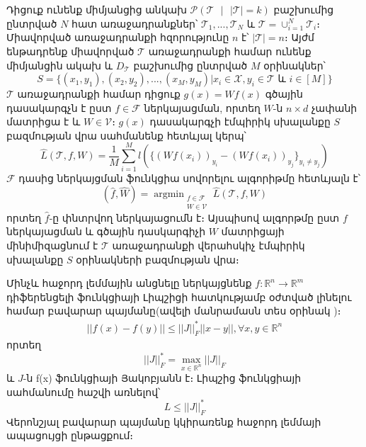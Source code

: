 \documentclass[12pt]{article}
\DeclareMathOperator*{\argmin}{argmin}
\begin{document}
Դիցուք ունենք միմյանցից անկախ $\mathcal{P}(\mathcal{T} \text{ } |\text{ }  |\mathcal{T}| = k)$ բաշխումից ընտրված $N$ հատ առաջադրանքներ՝ $\mathcal{T}_1, ..., \mathcal{T}_N$  և $\mathcal{T} = \cup_{i=1}^N{\mathcal{T}_i}$։ Միավորված առաջադրանքի հզորությունը $n$ է՝  $|\mathcal{T}| =n $։ Այժմ ենթադրենք միավորված $\mathcal{T}$ առաջադրանքի համար ունենք միմյանցին ակախ և $D_{\mathcal{T}}$ բաշխումից ընտրված $M$ օրինակներ՝
$$S = \{(x_1, y_1), (x_2, y_2), ..., (x_M, y_M) | x_i \in \mathcal{X}, y_i \in \mathcal{T} \text{ և } i \in [M] \}$$
$\mathcal{T}$   առաջադրանքի համար դիցուք $g(x) = Wf(x)$ գծային դասակարգչն է ըստ $f \in \mathcal{F}$ ներկայացման, որտեղ $W$-ն $n \times d$ չափանի մատրիցա է և $W \in \mathcal{V}$։ $g(x)$ դասակարգչի էմպիրիկ սխալանքը $S$ բազմության վրա սահմանենք հետևյալ կերպ՝
$$\hat{L}(\mathcal{T},f, W) = \frac{1}{M}\sum_{i=1}^Ml(\{(Wf(x_i))_{y_i} - (Wf(x_i))_{y_j}\}_{y_i \neq y_j})$$ 
$\mathcal{F}$ դասից  ներկայցման ֆունկցիա սովորելու ալգորիթմը հետևյալն է՝
$$(\hat{f}, \hat{W}) = \argmin_{\substack{f \in \mathcal{F} \\ W \in \mathcal{V}}} \hat{L}(\mathcal{T},f, W)$$
որտեղ $\hat{f}$-ը փնտրվող ներկայացումն է։ Այսպիսով ալգորթմը ըստ $f$ ներկայացման և գծային դասկարգիչի $W$ մատրիցայի  մինիմիզացնում է $\mathcal{T}$ առաջադրանքի վերահսկիչ էմպիրիկ սխալանքը $S$ օրինակների բազմության վրա։

Մինչև հաջորդ լեմմային անցնելը ներկայցնենք $f:\mathbb{R}^n \rightarrow \mathbb{R}^m$ դիֆերենցելի ֆունկցիայի Լիպշիցի հատկությամբ օժտված լինելու համար բավարար պայմանը(ավելի մանրամասն տես օրինակ \cite[էջ 60-61]{bib_item_13})։ 
\begin{align*}
||f(x) - f(y)|| \leq ||J||_F^* ||x-y||, \forall x, y \in \mathbb{R}^n
\end{align*}
որտեղ $$||J||^*_F =  \max_{x \in \mathbb{R}^n}||J||_F$$
և $J$-ն f(x) ֆունկցիայի Յակոբյանն է։  Լիպշից ֆունկցիայի սահմանումը հաշվի առնելով՝ $$L \leq ||J||_F^*$$
Վերոնշյալ բավարար պայմանը կկիրառենք հաջորդ լեմմայի ապացույցի ընթացքում։
\end{document}
